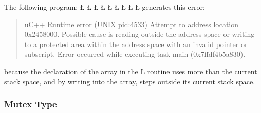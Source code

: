 \documentclass[openright,twoside]{report}
\begin{document}
The following program:
\LGinlinefalse\LGbegin\lgrinde
\L{}
\L{\LB{}}
\L{\LB{}}
\CE{}\L{\LB{}}
\L{\LB{}}
\CE{}\L{\LB{}}
\L{\LB{}}
\CE{}\L{\LB{}}
\L{\LB{\}}}
\endlgrinde\LGend
generates this error:
\begin{quote}
\BGfont
uC++ Runtime error (UNIX pid:4533) Attempt to address location 0x2458000.
Possible cause is reading outside the address space or writing to a protected area within the address space with an invalid pointer or subscript.
Error occurred while executing task main (0x7ffdf4b5a830).
\end{quote}
because the declaration of the array in the \LGinlinetrue\LGbegin\lgrinde\L{}\endlgrinde\LGend{} routine uses more than the current stack space, and by writing into the array, steps outside its current stack space.


\subsubsection{Mutex Type}
\label{s:MessagesMutexType}
\end{document}
